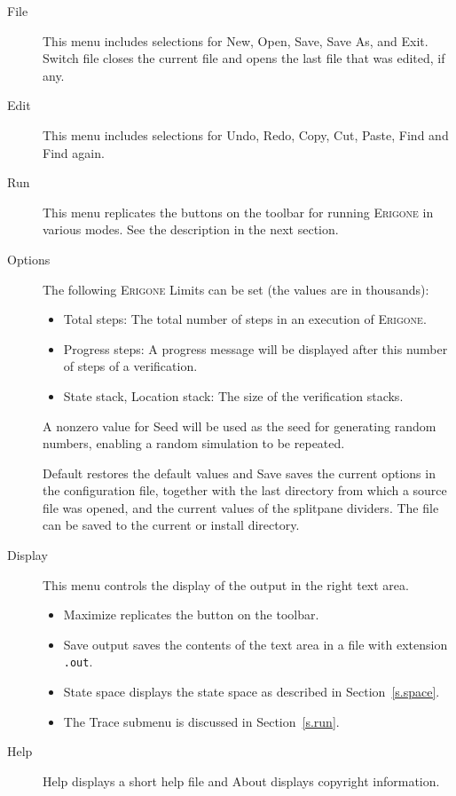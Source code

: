 \documentclass[11pt]{article}
\newcommand{\eri}{\textsc{Erigone}}
\newcommand{\p}[1]{\texttt{#1}}
\newcommand{\bu}[1]{\textsf{#1}}
\begin{document}
\begin{description}
\item[\bu{File}] This menu includes selections for \bu{New}, \bu{Open}, 
\bu{Save}, \bu{Save As}, and \bu{Exit}. \bu{Switch file} closes the 
current file and opens the last file that was edited, if any.

\item[\bu{Edit}] This menu includes selections for \bu{Undo}, \bu{Redo}, 
\bu{Copy}, \bu{Cut}, \bu{Paste}, \bu{Find} and \bu{Find again}.

\item[\bu{Run}] This menu replicates the buttons on the toolbar for
running \eri{} in various modes. See the description in the next
section.

\item[\bu{Options}] The following \eri{} \bu{Limits} can be set (the
values are in thousands):
\begin{itemize}
\item \bu{Total steps}: The total number of steps in an execution of
\eri{}.
\item \bu{Progress steps}: A progress message will be displayed
after this number of steps of a verification.
\item \bu{State stack}, \bu{Location stack}: The size of the
verification stacks.
\end{itemize}

A nonzero value for \bu{Seed} will be used as the seed for generating
random numbers, enabling a random simulation to be repeated.

\bu{Default} restores the default values and \bu{Save} saves the current
options in the configuration file, together with the last directory from
which a source file was opened, and the current values of the splitpane
dividers. The file can be saved to the \bu{current} or \bu{install}
directory.

\item[\bu{Display}] This menu controls the display of the output in the
right text area.
\begin{itemize}
\item \bu{Maximize} replicates the button on the toolbar.
\item \bu{Save output} saves the contents of the text area in a file with
extension \p{.out}.
\item \bu{State space} displays the state space as described in
Section~\ref{s.space}.
\item The \bu{Trace} submenu is discussed in
Section~\ref{s.run}.
\end{itemize}

\item[\bu{Help}] \bu{Help} displays a short help file and \bu{About} 
displays copyright information.
\end{description}
\end{document}
